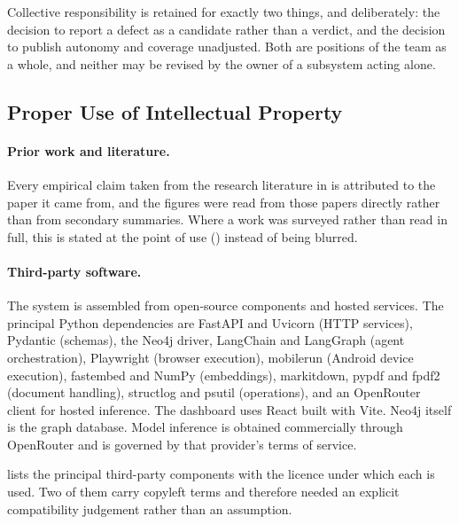 Collective responsibility is retained for exactly two things, and deliberately:
the decision to report a defect as a candidate rather than a verdict, and the
decision to publish autonomy and coverage unadjusted. Both are positions of the
team as a whole, and neither may be revised by the owner of a subsystem acting
alone.

\subsection{Proper Use of Intellectual Property}
\label{sec:ip}

\paragraph{Prior work and literature.} Every empirical claim taken from the
research literature in  is attributed to the paper it came
from, and the figures were read from those papers directly rather than from
secondary summaries. Where a work was surveyed rather than read in full, this
is stated at the point of use () instead of being
blurred.

\paragraph{Third-party software.} The system is assembled from open-source
components and hosted services. The principal Python dependencies are FastAPI
and Uvicorn (HTTP services), Pydantic (schemas), the Neo4j driver, LangChain
and LangGraph (agent orchestration), Playwright (browser execution), mobilerun
(Android device execution), fastembed and NumPy (embeddings), markitdown, pypdf
and fpdf2 (document handling), structlog and psutil (operations), and an
OpenRouter client for hosted inference. The dashboard uses React built with
Vite. Neo4j itself is the graph database. Model inference is obtained
commercially through OpenRouter and is governed by that provider's terms of
service.

 lists the principal third-party components with the licence
under which each is used. Two of them carry copyleft terms and therefore needed
an explicit compatibility judgement rather than an assumption.

